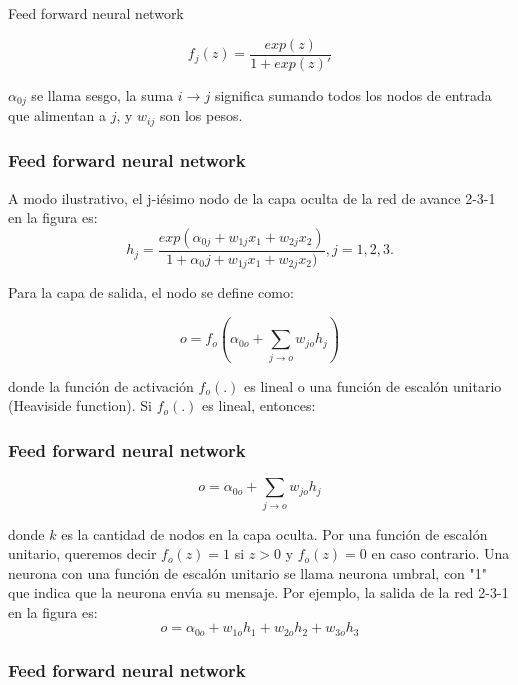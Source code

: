 \documentclass[spanish,xcolor=table]{beamer}
\begin{document}
\begin{section}{Feed forward neural network}
\begin{frame}
\begin{equation*} 
f_j (z) = \frac{exp(z)}{1+exp(z)'}
\end{equation*}

$\alpha_{0 j}$ se llama sesgo, la suma $i \to j$ significa sumando todos los nodos de entrada que alimentan a $j$, y $w_{ij}$ son los pesos.

\end{frame}
\begin{frame}
\frametitle{Feed forward neural network}

A modo ilustrativo, el j-i\'esimo nodo de la capa oculta de la red de avance 2-3-1 en la figura es:
\begin{equation}   \label{eq:-1}
h_j = \frac{exp(\alpha_{0j}+w_{1j} x_1+w_{2j} x_2)}{1+\alpha_0j+w_{1j} x_1+w_{2j} x_2)}, j=1,2,3.
\end{equation}

Para la capa de salida, el nodo se define como:

\begin{equation} 
o = f_o \left(\alpha_{0o} + \sum_{j \to o} w_{jo} h_j \right)
\end{equation}

donde la funci\'on de activaci\'on $f_o (.)$ es lineal o una funci\'on de escal\'on unitario (Heaviside function). Si $f_o (.)$ es lineal, entonces:

\end{frame}
\begin{frame}
\frametitle{Feed forward neural network}

\begin{equation*} 
o =  \alpha_{0o} + \sum_{j \to o} w_{jo} h_j 
\end{equation*}

donde $k$ es la cantidad de nodos en la capa oculta. Por una funci\'on  de escal\'on unitario, queremos decir $f_o(z)=1$ si $z > 0$ y $f_o(z)=0$  en caso contrario. Una neurona con una funci\'on de escal\'on unitario se llama neurona umbral, con "1" que indica que la neurona env\'{\i}a su mensaje. Por ejemplo, la salida de la red 2-3-1 en la figura es:
\begin{equation*} 
o = \alpha_{0o}+w_{1o} h_1+w_{2o} h_2+w_{3o} h_3
\end{equation*}
\end{frame}
\begin{frame}
\frametitle{Feed forward neural network}


\end{frame}
\end{section}
\end{document}
